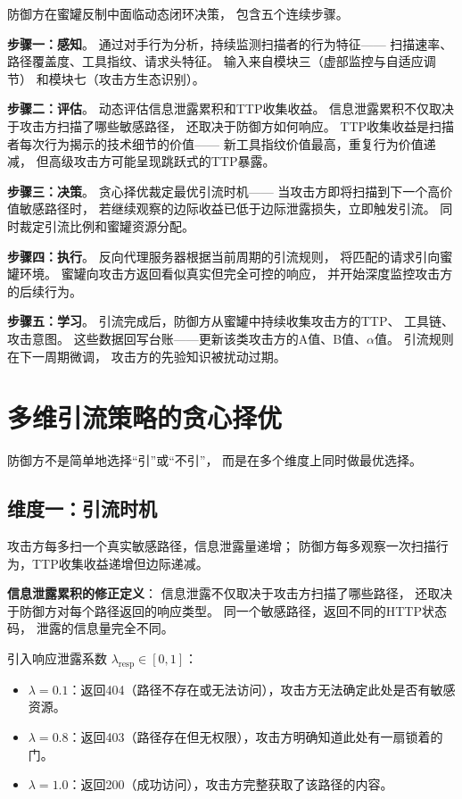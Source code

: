 \documentclass[11pt,a4paper]{article}
\begin{document}
防御方在蜜罐反制中面临动态闭环决策，
包含五个连续步骤。

\textbf{步骤一：感知}。
通过对手行为分析，持续监测扫描者的行为特征——
扫描速率、路径覆盖度、工具指纹、请求头特征。
输入来自模块三（虚部监控与自适应调节）
和模块七（攻击方生态识别）。

\textbf{步骤二：评估}。
动态评估信息泄露累积和TTP收集收益。
信息泄露累积不仅取决于攻击方扫描了哪些敏感路径，
还取决于防御方如何响应。
TTP收集收益是扫描者每次行为揭示的技术细节的价值——
新工具指纹价值最高，重复行为价值递减，
但高级攻击方可能呈现跳跃式的TTP暴露。

\textbf{步骤三：决策}。
贪心择优裁定最优引流时机——
当攻击方即将扫描到下一个高价值敏感路径时，
若继续观察的边际收益已低于边际泄露损失，立即触发引流。
同时裁定引流比例和蜜罐资源分配。

\textbf{步骤四：执行}。
反向代理服务器根据当前周期的引流规则，
将匹配的请求引向蜜罐环境。
蜜罐向攻击方返回看似真实但完全可控的响应，
并开始深度监控攻击方的后续行为。

\textbf{步骤五：学习}。
引流完成后，防御方从蜜罐中持续收集攻击方的TTP、
工具链、攻击意图。
这些数据回写台账——更新该类攻击方的A值、B值、$\alpha$值。
引流规则在下一周期微调，
攻击方的先验知识被扰动过期。

\section{多维引流策略的贪心择优}

防御方不是简单地选择“引”或“不引”，
而是在多个维度上同时做最优选择。

\subsection{维度一：引流时机}

攻击方每多扫一个真实敏感路径，信息泄露量递增；
防御方每多观察一次扫描行为，TTP收集收益递增但边际递减。

\textbf{信息泄露累积的修正定义}：
信息泄露不仅取决于攻击方扫描了哪些路径，
还取决于防御方对每个路径返回的响应类型。
同一个敏感路径，返回不同的HTTP状态码，
泄露的信息量完全不同。

引入响应泄露系数 $\lambda_{\text{resp}} \in [0,1]$：
\begin{itemize}
    \item $\lambda = 0.1$：返回404（路径不存在或无法访问），攻击方无法确定此处是否有敏感资源。
    \item $\lambda = 0.8$：返回403（路径存在但无权限），攻击方明确知道此处有一扇锁着的门。
    \item $\lambda = 1.0$：返回200（成功访问），攻击方完整获取了该路径的内容。
\end{itemize}
\end{document}
